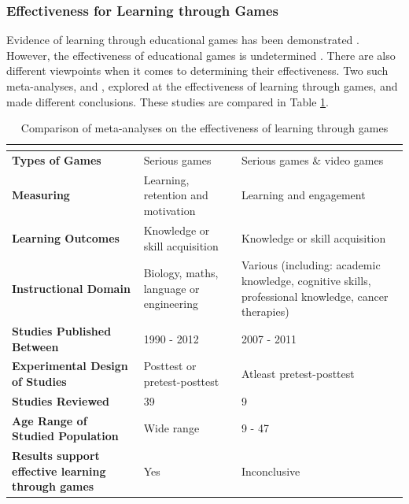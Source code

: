 \documentclass[a4paper,11.5pt]{report}
\numberwithin{figure}{section}
\numberwithin{table}{section}
\numberwithin{equation}{section}
\numberwithin{equation}{section}
\begin{document}


\subsubsection{Effectiveness for Learning through Games} %

Evidence of learning through educational games has been demonstrated \citep{Connolly2012, Pieter2013, Girard2013}. However, the effectiveness of educational games is undetermined \citep{Connolly2012, Girard2013}. There are also different viewpoints when it comes to determining their effectiveness. Two such meta-analyses, \citet{Pieter2013} and \citet{Girard2013}, explored at the effectiveness of learning through games, and made different conclusions. These studies are compared in Table \ref{tab:effectivess learning comparison}.

\begin{table}[H]
\centering
\caption{Comparison of meta-analyses on the effectiveness of learning through games}
\label{tab:effectivess learning comparison}
\begin{tabular}{p{3.4cm} | p{5cm} | p{5cm}}
       & \textbf{\citet{Pieter2013}}                  & \textbf{\citet{Girard2013}}               \\ \hline
\textbf{Types of Games}  & Serious games                & Serious games \& video games               
\\ \hline
\textbf{Measuring}   & Learning, retention and motivation                   & Learning and engagement              
\\ \hline
\textbf{Learning Outcomes}	& Knowledge or skill acquisition 	& Knowledge or skill acquisition
\\ \hline
\textbf{Instructional Domain}	& Biology, maths, language or engineering	& Various (including: academic knowledge, cognitive skills, professional knowledge, cancer therapies)
\\ \hline
\textbf{Studies Published Between}		& 1990 - 2012		& 2007 - 2011
\\ \hline
\textbf{Experimental Design of Studies}		& Posttest or pretest-posttest		& Atleast pretest-posttest
\\ \hline
\textbf{Studies Reviewed} & 39                         & 9		                 
\\ \hline
\textbf{Age Range of Studied Population} & Wide range                         & 9 - 47		                 
\\ \hline
\textbf{Results support effective learning through games} & Yes                         & Inconclusive
\end{tabular}
\end{table}
\end{document}
